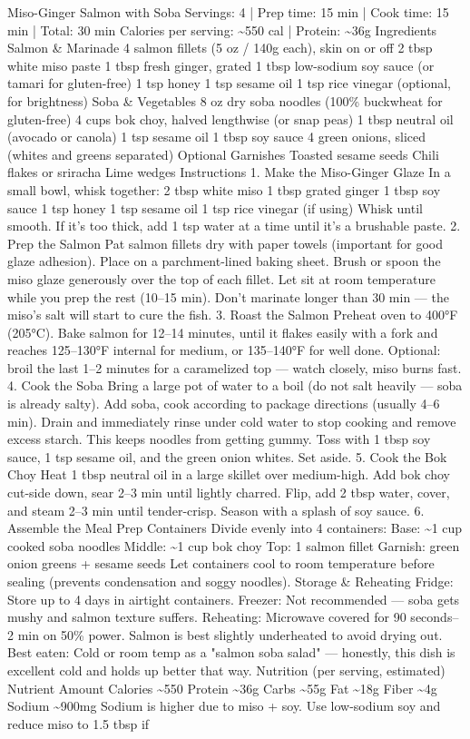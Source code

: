Miso-Ginger Salmon with Soba Servings: 4 | Prep time: 15 min | Cook time: 15 min | Total: 30 min Calories per serving: \~{}550 cal | Protein: \~{}36g Ingredients Salmon \& Marinade 4 salmon fillets (5 oz / 140g each), skin on or off 2 tbsp white miso paste 1 tbsp fresh ginger, grated 1 tbsp low-sodium soy sauce (or tamari for gluten-free) 1 tsp honey 1 tsp sesame oil 1 tsp rice vinegar (optional, for brightness) Soba \& Vegetables 8 oz dry soba noodles (100\% buckwheat for gluten-free) 4 cups bok choy, halved lengthwise (or snap peas) 1 tbsp neutral oil (avocado or canola) 1 tsp sesame oil 1 tbsp soy sauce 4 green onions, sliced (whites and greens separated) Optional Garnishes Toasted sesame seeds Chili flakes or sriracha Lime wedges Instructions 1. Make the Miso-Ginger Glaze In a small bowl, whisk together: 2 tbsp white miso 1 tbsp grated ginger 1 tbsp soy sauce 1 tsp honey 1 tsp sesame oil 1 tsp rice vinegar (if using) Whisk until smooth. If it's too thick, add 1 tsp water at a time until it's a brushable paste. 2. Prep the Salmon Pat salmon fillets dry with paper towels (important for good glaze adhesion). Place on a parchment-lined baking sheet. Brush or spoon the miso glaze generously over the top of each fillet. Let sit at room temperature while you prep the rest (10–15 min). Don't marinate longer than 30 min — the miso's salt will start to cure the fish. 3. Roast the Salmon Preheat oven to 400°F (205°C). Bake salmon for 12–14 minutes, until it flakes easily with a fork and reaches 125–130°F internal for medium, or 135–140°F for well done. Optional: broil the last 1–2 minutes for a caramelized top — watch closely, miso burns fast. 4. Cook the Soba Bring a large pot of water to a boil (do not salt heavily — soba is already salty). Add soba, cook according to package directions (usually 4–6 min). Drain and immediately rinse under cold water to stop cooking and remove excess starch. This keeps noodles from getting gummy. Toss with 1 tbsp soy sauce, 1 tsp sesame oil, and the green onion whites. Set aside. 5. Cook the Bok Choy Heat 1 tbsp neutral oil in a large skillet over medium-high. Add bok choy cut-side down, sear 2–3 min until lightly charred. Flip, add 2 tbsp water, cover, and steam 2–3 min until tender-crisp. Season with a splash of soy sauce. 6. Assemble the Meal Prep Containers Divide evenly into 4 containers: Base: \~{}1 cup cooked soba noodles Middle: \~{}1 cup bok choy Top: 1 salmon fillet Garnish: green onion greens + sesame seeds Let containers cool to room temperature before sealing (prevents condensation and soggy noodles). Storage \& Reheating Fridge: Store up to 4 days in airtight containers. Freezer: Not recommended — soba gets mushy and salmon texture suffers. Reheating: Microwave covered for 90 seconds–2 min on 50\% power. Salmon is best slightly underheated to avoid drying out. Best eaten: Cold or room temp as a "salmon soba salad" — honestly, this dish is excellent cold and holds up better that way. Nutrition (per serving, estimated) Nutrient Amount Calories \~{}550 Protein \~{}36g Carbs \~{}55g Fat \~{}18g Fiber \~{}4g Sodium \~{}900mg Sodium is higher due to miso + soy. Use low-sodium soy and reduce miso to 1.5 tbsp if 